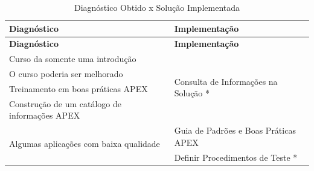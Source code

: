 \begin{longtable}{|m{8.0cm}|m{8.0cm}|}
\caption{Diagnóstico Obtido x Solução Implementada}\\
\hline
\textbf{Diagnóstico} & \textbf{Implementação} \\
\hline
\endfirsthead
\hline
\textbf{Diagnóstico} & \textbf{Implementação} \\
\hline
\endhead
Curso da somente uma introdução                                                                                                   & \multirow{4}{*}{Consulta de Informações na Solução *}                                                                                                                                                      \\ \cline{1-1}
O curso poderia ser melhorado                                                                                                     &                                                                                                                                                                                                            \\ \cline{1-1}
Treinamento em boas práticas APEX                                                                                                 &                                                                                                                                                                                                            \\ \cline{1-1}
Construção de um catálogo de informações APEX                                                                                     &                                                                                                                                                                                                            \\ \hline
\multirow{3}{*}{Algumas aplicações com baixa qualidade}                                                                           & Guia de Padrões e Boas Práticas APEX                                                                                                                                                                       \\ \cline{2-2} 
                                                                                                                                  & Definir Procedimentos de Teste *                                                                                                                                                                           \\ \cline{2-2} 

\end{longtable}
